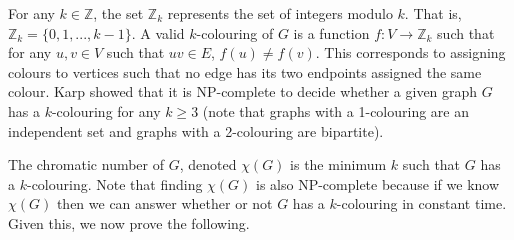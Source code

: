\documentclass[letterpaper,12pt,titlepage,oneside,final]{article}
\begin{document}
For any $k \in \mathbb{Z}$, the set $\mathbb{Z}_{k}$ represents the set of integers modulo $k$. That is, $\mathbb{Z}_{k} = \{0, 1, ..., k - 1\}$. A valid $k$-colouring of $G$ is a function $f: V \rightarrow \mathbb{Z}_{k}$ such that for any $u, v \in V$ such that $uv \in E$, $f(u) \neq f(v)$. This corresponds to assigning colours to vertices such that no edge has its two endpoints assigned the same colour. Karp \cite{karp1972reducibility} showed that it is NP-complete to decide whether a given graph $G$ has a $k$-colouring for any $k \geq 3$ (note that graphs with a 1-colouring are an independent set and graphs with a 2-colouring are bipartite).

The chromatic number of $G$, denoted $\chi(G)$ is the minimum $k$ such that $G$ has a $k$-colouring. Note that finding $\chi(G)$ is also NP-complete because if we know $\chi(G)$ then we can answer whether or not $G$ has a $k$-colouring in constant time. Given this, we now prove the following.
\end{document}
